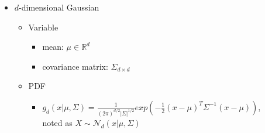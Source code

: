  \begin{itemize}
 	\item $d$-dimensional Gaussian
 		\begin{itemize}
 		\item Variable
 			\begin{itemize}
 			\item mean: $\mu \in \mathbb R^d$
 			\item covariance matrix: $\Sigma_{d\times d}$
 			\end{itemize}
 		\item PDF
 			\begin{itemize}
 			\item $\displaystyle g_d(x|\mu,\Sigma) = \frac 1 {(2\pi)^{d/2} |\Sigma|^{1/2}} exp \left( -\frac 1 2 (x-\mu)^T \Sigma^{-1} (x-\mu) \right) $, \\
 			noted as $X\sim \mathcal N_d (x|\mu,\Sigma)$
 			\end{itemize}
 		\end{itemize}
 	

\end{itemize}
